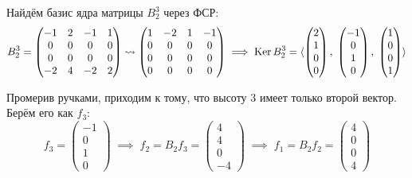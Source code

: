 Найдём базис ядра матрицы $B_2^3$ через ФСР:
\[
    B_2^3 =
    \begin{pmatrix}
        -1 & 2 & -1 & 1 \\
        0  & 0 & 0  & 0 \\
        0  & 0 & 0  & 0 \\
        -2 & 4 & -2 & 2
    \end{pmatrix}
    \leadsto
    \begin{pmatrix}
        1 & -2 & 1 & -1 \\
        0 & 0  & 0 & 0  \\
        0 & 0  & 0 & 0  \\
        0 & 0  & 0 & 0
    \end{pmatrix}
    \implies
    \operatorname{Ker} B_2^3 =
    \langle
    \begin{pmatrix}
        2 \\
        1 \\
        0 \\
        0
    \end{pmatrix},\;
    \begin{pmatrix}
        -1 \\
        0  \\
        1  \\
        0
    \end{pmatrix},\;
    \begin{pmatrix}
        1 \\
        0 \\
        0 \\
        1
    \end{pmatrix}
    \rangle
\]

Промерив ручками, приходим к тому, что высоту 3 имеет только второй вектор. Берём его как $f_3$:
\[
    f_3 =
    \begin{pmatrix}
        -1 \\
        0  \\
        1  \\
        0
    \end{pmatrix}
    \;\implies\;
    f_2 = B_2f_3 =
    \begin{pmatrix}
        4 \\
        4 \\
        0 \\
        -4
    \end{pmatrix}
    \;\implies\;
    f_1 = B_2f_2 =
    \begin{pmatrix}
        4 \\
        0 \\
        0 \\
        4
    \end{pmatrix}
\]


